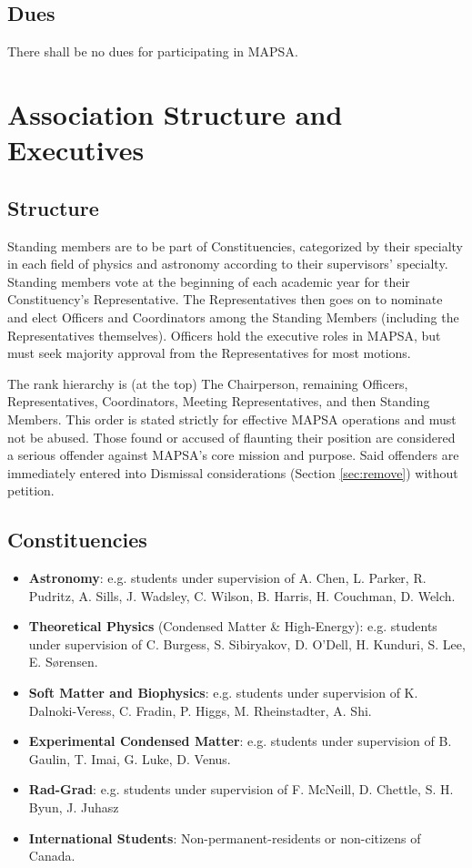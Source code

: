 \documentclass[8pt]{article}
\begin{document}
	\subsection{Dues}
	There shall be no dues for participating in MAPSA.
	
	\section{Association Structure and Executives}
	\subsection{Structure}\label{subsec:structure}
	Standing members are to be part of Constituencies, categorized by their specialty in each field of physics and astronomy according to their supervisors' specialty. Standing members vote at the beginning of each academic year for their Constituency's Representative. The Representatives then goes on to nominate and elect Officers and Coordinators among the Standing Members (including the Representatives themselves). Officers hold the executive roles in MAPSA, but must seek majority approval from the Representatives for most motions. 
	
	\noindent The rank hierarchy is (at the top) The Chairperson, remaining Officers, Representatives, Coordinators, Meeting Representatives, and then Standing Members. This order is stated strictly for effective MAPSA operations and must not be abused. Those found or accused of flaunting their position are considered a serious offender against MAPSA's core mission and purpose. Said offenders are immediately entered into Dismissal considerations (Section \ref{sec:remove}) without petition.
	\subsection{Constituencies}
	\begin{itemize}
		\item \textbf{Astronomy}: e.g. students under supervision of A. Chen, L. Parker, R. Pudritz, A. Sills, J. Wadsley, C. Wilson, B. Harris, H. Couchman, D. Welch.
		\item \textbf{Theoretical Physics} (Condensed Matter \& High-Energy): e.g. students under supervision of C. Burgess, S. Sibiryakov, D. O'Dell, H. Kunduri, S. Lee, E. Sørensen.
		\item \textbf{Soft Matter and Biophysics}: e.g. students under supervision of K. Dalnoki-Veress, C. Fradin, P. Higgs, M. Rheinstadter, A. Shi.
		\item \textbf{Experimental Condensed Matter}: e.g. students under supervision of B. Gaulin, T. Imai, G. Luke, D. Venus.
		\item \textbf{Rad-Grad}: e.g. students under supervision of F. McNeill, D. Chettle, S. H. Byun, J. Juhasz
		\item \textbf{International Students}: Non-permanent-residents or non-citizens of Canada.
	\end{itemize}
	
\end{document}
